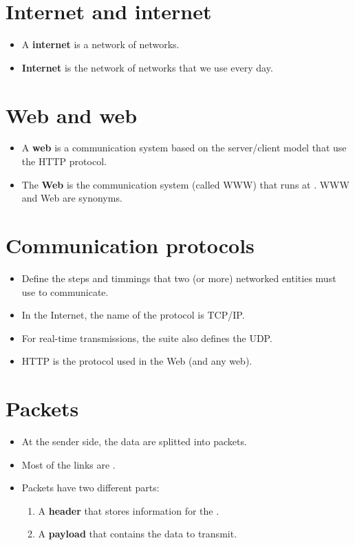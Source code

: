 \section{Internet and internet}
\begin{itemize}
\item A \textbf{internet} is a network of networks.
\item \textbf{Internet} is the network of networks that we use every day.
\end{itemize}

\section{Web and web}
\begin{itemize}
\item A \textbf{web} is a communication system based on the
server/client model that use the \gls{HTTP} protocol.
\item The \textbf{Web} is the communication system (called \gls{WWW})
that runs at . \gls{WWW} and Web are synonyms.
\end{itemize}

\section{Communication protocols}
\begin{itemize}
\item Define the steps and timmings that two (or more) networked
entities must use to communicate.
\item In the Internet, the name of the protocol  is \acrshort{TCP}/\acrshort{IP}.
\item For real-time transmissions, the suite also defines the
\gls{UDP}.
\item \gls{HTTP} is the protocol used in the Web (and any web).
\end{itemize}

\section{Packets}
\begin{itemize}
\item At the sender side, the data are splitted into packets.
\item Most of the links are .
\item Packets have two different parts:
\begin{enumerate}
\item A \textbf{header} that stores information for the .
\item A \textbf{payload} that contains the data to transmit.
\end{enumerate}
\end{itemize}
